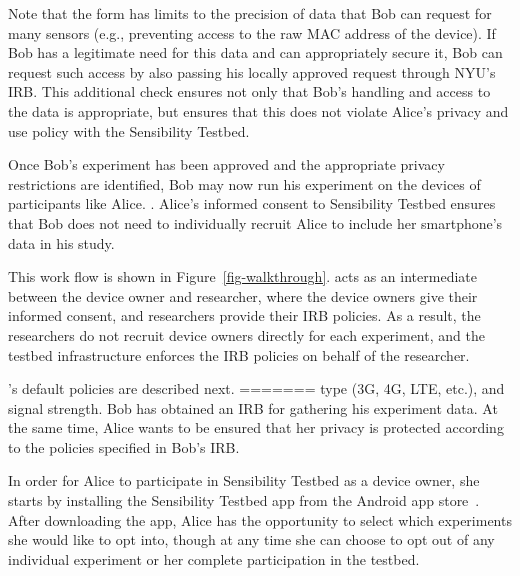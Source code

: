 Note that the form has limits to the precision of data that Bob can request
for many sensors (e.g., preventing access to the raw MAC address of the device).
If Bob has a legitimate need for this data and can appropriately secure it,
Bob can request such access by also passing his locally approved request 
through NYU's IRB.  This additional check ensures not only that Bob's 
handling and access to the data is appropriate, but ensures that this does
not violate Alice's privacy and use policy with the Sensibility Testbed.

Once Bob's experiment has been approved and the appropriate privacy
restrictions are identified, Bob may now run his experiment on the
devices of participants like Alice.  .  Alice's informed consent to Sensibility Testbed
ensures that Bob does not need to individually recruit Alice to include
her smartphone's data in his study.

This work flow is shown in Figure~\ref{fig-walkthrough}. \sysname
acts as an intermediate between the device owner and researcher, 
where the device owners give their informed consent, and researchers
provide their IRB policies. As a result, the researchers do not recruit
device owners directly for each experiment, and the testbed infrastructure 
enforces the IRB policies on behalf of the researcher. 

\sysname's default policies are described next.
=======
type (3G, 4G, LTE, etc.), and signal strength. Bob has obtained an IRB for gathering 
his experiment data. At the same time, Alice wants to be ensured that her privacy is 
protected according to the policies specified in Bob's IRB.

In order for Alice to participate in Sensibility Testbed as a device owner,
she starts by installing the Sensibility Testbed app from 
the Android app store~\cite{sensibility-app}. After downloading the app, 
Alice has the opportunity to select which experiments she would like to opt into, 
though at any time she can choose to opt out of any individual experiment or her 
complete participation in the testbed.

